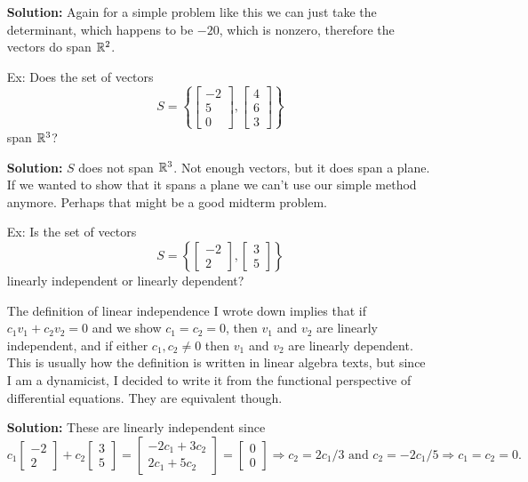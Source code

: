 \documentclass[reqno]{amsart}
\theoremstyle{definition}
\begin{document}
\begin{enumerate}
\textbf{Solution:  }  Again for a simple problem like this we can just take the determinant,
which happens to be $-20$, which is nonzero, therefore the vectors do span $\mathbb{R}^2$.

\item[Ex:  ]  Does the set of vectors
%
\begin{equation*}
S = \left\lbrace\begin{bmatrix}
-2\\
5\\
0
\end{bmatrix}, \begin{bmatrix}
4\\
6\\
3
\end{bmatrix}\right\rbrace
\end{equation*}
%
span $\mathbb{R}^3$?

\textbf{Solution:  } $S$ does not span $\mathbb{R}^3$.  Not enough vectors, but it does span a plane.
If we wanted to show that it spans a plane we can't use our simple method anymore.  {\color{red}
Perhaps that might be a good midterm problem}.

\item[Ex:  ]  Is the set of vectors
%
\begin{equation*}
S = \left\lbrace\begin{bmatrix}
-2\\
2
\end{bmatrix}, \begin{bmatrix}
3\\
5
\end{bmatrix}\right\rbrace
\end{equation*}
%
linearly independent or linearly dependent?

{\color{blue}The definition of linear independence I wrote down implies that if $c_1v_1+c_2v_2 = 0$
and we show $c_1=c_2=0$, then $v_1$ and $v_2$ are linearly independent, and if either $c_1,c_2 \neq 0$
then $v_1$ and $v_2$ are linearly dependent.}  {\color{red}This is usually how the definition is
written in linear algebra texts, but since I am a dynamicist, I decided to write it from the
functional perspective of differential equations.  They are equivalent though.}

\textbf{Solution:  }
These are linearly independent since
%
\begin{equation*}
c_1\begin{bmatrix}
-2\\
2
\end{bmatrix} + c_2\begin{bmatrix}
3\\
5
\end{bmatrix} = \begin{bmatrix}
-2c_1 + 3c_2\\
2c_1 + 5c_2
\end{bmatrix} = \begin{bmatrix}
0\\
0
\end{bmatrix} \Rightarrow c_2 = 2c_1/3 \text{  and  } c_2 = -2c_1/5 \Rightarrow c_1 = c_2 = 0.
\end{equation*}


\end{enumerate}
\end{document}
